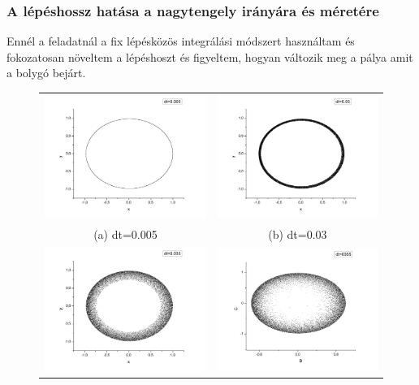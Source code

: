 \documentclass[paper=a4, fontsize=11pt]{article}
\begin{document}
\subsubsection{A lépéshossz hatása a nagytengely irányára és méretére}
Ennél a feladatnál a fix lépésközös integrálási módszert használtam és fokozatosan növeltem a lépéshoszt és figyeltem, hogyan változik meg a pálya amit a bolygó bejárt. 


\begin{figure}[H]
\begin{tabular}{cc}
  \includegraphics[width=65mm]{f0005} &   \includegraphics[width=65mm]{f0003} \\
(a) dt=0.005 & (b) dt=0.03 \\[6pt]
 \includegraphics[width=65mm]{f00035} &   \includegraphics[width=65mm]{f000355} \\

\end{tabular}
\end{figure}
\end{document}
